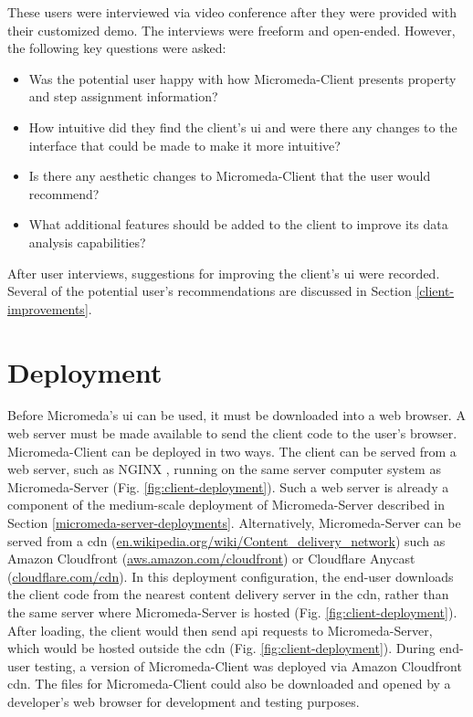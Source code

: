 These users were interviewed via video conference after they were provided with 
their customized demo. The interviews were freeform and open-ended. However, the 
following key questions were asked:

\begin{itemize}
\item Was the potential user happy with how Micromeda-Client presents property 
and step assignment information?
\item How intuitive did they find the client’s \gls{ui} and were there any 
changes to the interface that could be made to make it more intuitive?
\item Is there any aesthetic changes to Micromeda-Client that the user would 
recommend?
\item What additional features should be added to the client to improve its data 
analysis capabilities?
\end{itemize}

After user interviews, suggestions for improving the client’s \gls{ui} were 
recorded. Several of the potential user's recommendations are discussed in 
Section \ref{client-improvements}.

\section{Deployment}

Before Micromeda's \gls{ui} can be used, it must be downloaded into a web 
browser. A web server must be made available to send the client code to the 
user's browser. Micromeda-Client can be deployed in two ways. The client can be 
served from a web server, such as NGINX \cite{reese2008nginx}, running on the 
same server computer system as Micromeda-Server (Fig. 
\ref{fig:client-deployment}). Such a web server is already a component of the 
medium-scale deployment of Micromeda-Server described in Section 
\ref{micromeda-server-deployments}. Alternatively, Micromeda-Server can be 
served from a \gls{cdn} \cite{farber2003internet} 
(\href{http://en.wikipedia.org/wiki/Content_delivery_network}{en.wikipedia.org/wiki/Content\_delivery\_network}) 
such as Amazon Cloudfront \cite{varia2014overview} 
(\href{http://aws.amazon.com/cloudfront}{aws.amazon.com/cloudfront}) or 
Cloudflare Anycast \cite{calder2015analyzing} 
(\href{http://cloudflare.com/cdn}{cloudflare.com/cdn}). In this deployment 
configuration, the end-user downloads the client code from the nearest content 
delivery server in the \gls{cdn}, rather than the same server where 
Micromeda-Server is hosted (Fig. \ref{fig:client-deployment}). After loading, 
the client would then send \gls{api} requests to Micromeda-Server, which would 
be hosted outside the \gls{cdn}  (Fig. \ref{fig:client-deployment}). During 
end-user testing, a version of Micromeda-Client was deployed via Amazon 
Cloudfront \gls{cdn}. The files for Micromeda-Client could also be downloaded 
and opened by a developer's web browser for development and testing purposes.


